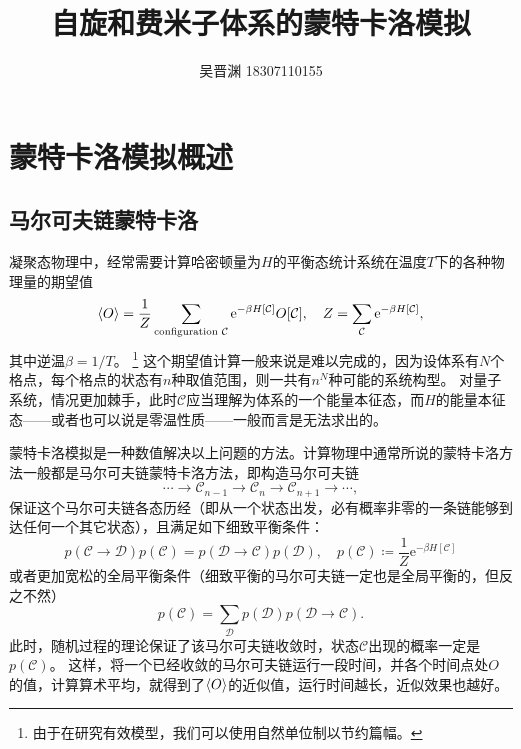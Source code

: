 \documentclass[UTF8]{ctexart}
\title{自旋和费米子体系的蒙特卡洛模拟}
\author{吴晋渊 18307110155}
\newcommand*{\ee}{\mathrm{e}}
\begin{document}
\maketitle

\section{蒙特卡洛模拟概述}

\subsection{马尔可夫链蒙特卡洛}

凝聚态物理中，经常需要计算哈密顿量为$H$的平衡态统计系统在温度$T$下的各种物理量的期望值
\begin{equation}
    \expval{O} = \frac{1}{Z} \sum_{\text{configuration $\mathcal{C}$}} \ee^{- \beta H[\mathcal{C}]} O[\mathcal{C}], \quad Z = \sum_{\mathcal{C}} \ee^{- \beta H[\mathcal{C}]},
    \label{eq:sampling}
\end{equation}
其中逆温$\beta = 1 / T$。%
\footnote{
    由于在研究有效模型，我们可以使用自然单位制以节约篇幅。
}%
这个期望值计算一般来说是难以完成的，因为设体系有$N$个格点，每个格点的状态有$n$种取值范围，则一共有$n^N$种可能的系统构型。
对量子系统，情况更加棘手，此时$\mathcal{C}$应当理解为体系的一个能量本征态，而$H$的能量本征态——或者也可以说是零温性质——一般而言是无法求出的。

蒙特卡洛模拟是一种数值解决以上问题的方法。计算物理中通常所说的蒙特卡洛方法一般都是马尔可夫链蒙特卡洛方法，即构造马尔可夫链
\begin{equation}
    \cdots \rightarrow \mathcal{C}_{n-1} \rightarrow \mathcal{C}_n \rightarrow \mathcal{C}_{n+1} \rightarrow \cdots,
\end{equation}
保证这个马尔可夫链各态历经（即从一个状态出发，必有概率非零的一条链能够到达任何一个其它状态），且满足如下细致平衡条件：
\begin{equation}
    p(\mathcal{C} \to \mathcal{D}) p(\mathcal{C}) = p(\mathcal{D} \to \mathcal{C}) p(\mathcal{D}), \quad p(\mathcal{C}) \coloneqq \frac{1}{Z} \ee^{- \beta H[\mathcal{C}]}
\end{equation}
或者更加宽松的全局平衡条件（细致平衡的马尔可夫链一定也是全局平衡的，但反之不然）
\begin{equation}
    p(\mathcal{C}) = \sum_\mathcal{D} p(\mathcal{D}) p(\mathcal{D} \to \mathcal{C}).
\end{equation}
此时，随机过程的理论保证了该马尔可夫链收敛时，状态$\mathcal{C}$出现的概率一定是$p(\mathcal{C})$。
这样，将一个已经收敛的马尔可夫链运行一段时间，并各个时间点处$O$的值，计算算术平均，就得到了$\expval{O}$的近似值，运行时间越长，近似效果也越好。
\end{document}
